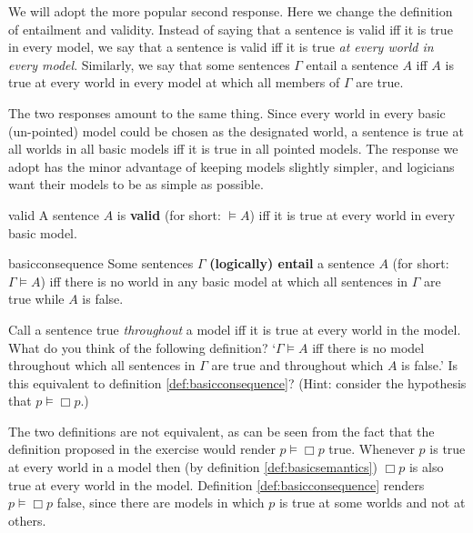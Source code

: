 We will adopt the more popular second response. Here we change the definition of
entailment and validity. Instead of saying that a sentence is valid iff it is
true in every model, we say that a sentence is valid iff it is true \emph{at
  every world in every model}. Similarly, we say that some sentences $\Gamma$
entail a sentence $A$ iff $A$ is true at every world in every model at which all
members of $\Gamma$ are true.

The two responses amount to the same thing. Since every world in every basic
(un-pointed) model could be chosen as the designated world, a sentence is true at all worlds in all basic models iff
it is true in all pointed models. The response we adopt has the minor advantage
of keeping models slightly simpler, and logicians want their models to be as
simple as possible.

\begin{definition}{}{valid}
  A sentence $A$ is \textbf{valid} (for short: $\models A$) iff
  it is true at every world in every basic model.
\end{definition}
%
\begin{definition}{}{basicconsequence}
  Some sentences $\Gamma$ \textbf{(logically) entail} a sentence $A$ (for short:
  $\Gamma \models A$) iff there is no world in any basic model at which all sentences in $\Gamma$ are true while $A$ is false.
\end{definition}

\begin{exercise}
  Call a sentence true \emph{throughout} a model iff it is true at every world
  in the model. What do you think of the following definition?
  `$\Gamma \models A$ iff there is no model throughout which all sentences in 
  $\Gamma$ are true and throughout which $A$ is false.' Is this equivalent to
  definition \ref{def:basicconsequence}? (Hint: consider the hypothesis that
  $p \models \Box p$.)
\end{exercise}
\begin{solution}
  The two definitions are not equivalent, as can be seen from the fact that the
  definition proposed in the exercise would render $p \models \Box p$ true.
  Whenever $p$ is true at every world in a model then (by definition
  \ref{def:basicsemantics}) $\Box p$ is also true at every world in the model.
  Definition \ref{def:basicconsequence} renders $p \models \Box p$ false, since
  there are models in which $p$ is true at some worlds and not at others.
\end{solution}

